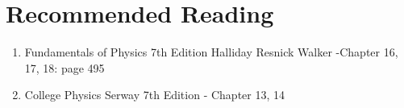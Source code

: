 \documentclass{article}
\begin{document}
\section{Recommended Reading}

\begin{enumerate}
    \item Fundamentals of Physics 7th Edition Halliday Resnick Walker -Chapter 16, 17, 18: page 495 \\
    \item College Physics Serway 7th Edition - Chapter 13, 14
\end{enumerate}
\newpage
\end{document}
